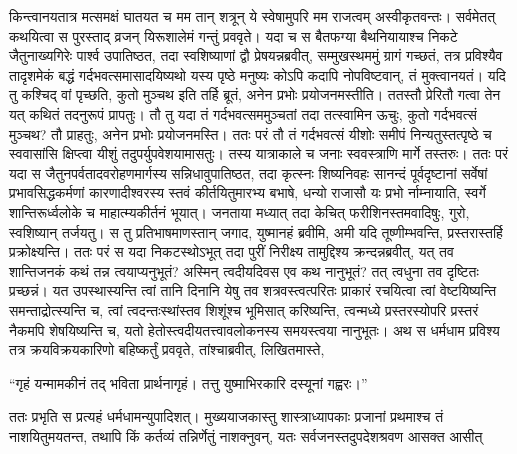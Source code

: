 \vakya किन्त्वानयतात्र मत्समक्षं घातयत च मम तान् शत्रून् ये स्वेषामुपरि मम राजत्वम् अस्वीकृतवन्तः।
\vakya सर्वमेतत् कथयित्वा स पुरस्ताद् व्रजन् यिरूशालेमं गन्तुं प्रववृते।
\vakya यदा च स बैतफग्या बैथनियायाश्च निकटे जैतुनाख्यगिरेः पार्श्व उपातिष्ठत, तदा स्वशिष्याणां द्वौ प्रेषयन्नब्रवीत्,
\vakya सम्मुखस्थममुं ग्रागं गच्छतं, तत्र प्रविश्यैव तादृशमेकं बद्धं गर्दभवत्समासादयिष्यथो यस्य पृष्ठे मनुष्यः कोऽपि कदापि नोपविष्टवान्, तं मुक्त्वानयतं।
\vakya यदि तु कश्चिद् वां पृच्छति, कुतो मुञ्चथ इति तर्हि ब्रूतं, अनेन प्रभोः प्रयोजनमस्तीति।
\vakya ततस्तौ प्रेरितौ गत्वा तेन यत् कथितं तदनुरूपं प्रापतुः।
\vakya तौ तु यदा तं गर्दभवत्सममुञ्चतां तदा तत्स्वामिन ऊचुः, कुतो गर्दभवत्सं मुञ्चथ?
\vakya तौ प्राहतुः, अनेन प्रभोः प्रयोजनमस्ति।
\vakya ततः परं तौ तं गर्दभवत्सं यीशोः समीपं निन्यतुस्तत्पृष्ठे च स्ववासांसि क्षिप्त्वा यीशुं तदुपर्युपवेशयामासतुः।
\vakya तस्य यात्राकाले च जनाः स्ववस्त्राणि मार्गे तस्तरुः।
\vakya ततः परं यदा स जैतुनपर्वतादवरोहणमार्गस्य सन्निधावुपातिष्ठत, तदा कृत्स्नः शिष्यनिवहः सानन्दं पूर्वदृष्टानां सर्वेषां प्रभावसिद्धकर्मणां कारणादीश्वरस्य स्तवं कीर्तयितुमारभ्य बभाषे,
\vakya धन्यो राजासौ यः प्रभो र्नाम्नायाति, स्वर्गे शान्तिरूर्ध्वलोके च माहात्म्यकीर्तनं भूयात्।
\vakya जनताया मध्यात् तदा केचित् फरीशिनस्तमवादिषुः, गुरो, स्वशिष्यान् तर्जयतु।
\vakya स तु प्रतिभाषमाणस्तान् जगाद, युष्मानहं ब्रवीमि, अमी यदि तूष्णीम्भवन्ति, प्रस्तरास्तर्हि प्रक्रोक्ष्यन्ति।
\vakya ततः परं स यदा निकटस्थोऽभूत् तदा पुरीं निरीक्ष्य तामुद्दिश्य क्रन्दन्नब्रवीत्,
\vakya यत् तव शान्तिजनकं कथं तन्न त्वयाप्यनुभूतं? अस्मिन् त्वदीयदिवस एव कथ नानुभूतं? तत् त्वधुना तव दृष्टितः प्रच्छन्नं।
\vakya यत उपस्थास्यन्ति त्वां तानि दिनानि येषु तव शत्रवस्त्वत्परितः प्राकारं रचयित्वा त्वां वेष्टयिष्यन्ति समन्ताद्रोत्स्यन्ति च,
\vakya त्वां त्वदन्तःस्थांस्तव शिशूंश्च भूमिसात् करिष्यन्ति, त्वन्मध्ये प्रस्तरस्योपरि प्रस्तरं नैकमपि शेषयिष्यन्ति च, यतो हेतोस्त्वदीयतत्त्वावलोकनस्य समयस्त्वया नानुभूतः।
\vakya अथ स धर्मधाम प्रविश्य तत्र क्रयविक्रयकारिणो बहिष्कर्तुं प्रववृते,
\vakya तांश्चाब्रवीत्, लिखितमास्ते,
\begin{poem}
\startwithline “गृहं यन्मामकीनं तद् भविता प्रार्थनागृहं।
\pline तत्तु युष्माभिरकारि दस्यूनां गह्वरः।”
\end{poem}
\vakya ततः प्रभृति स प्रत्यहं धर्मधामन्युपादिशत्।
\vakya मुख्ययाजकास्तु शास्त्राध्यापकाः प्रजानां प्रथमाश्च तं नाशयितुमयतन्त, तथापि किं कर्तव्यं तन्निर्णेतुं नाशक्नुवन्, यतः सर्वजनस्तदुपदेशश्रवण आसक्त आसीत्\eoc